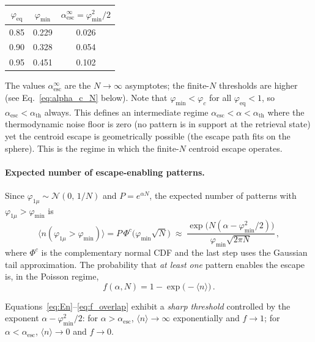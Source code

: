 \documentclass[11pt]{article}
\newcommand{\avg}[1]{\langle #1 \rangle}
\begin{document}
\begin{center}
\begin{tabular}{ccc}
\toprule
$\varphi_{\mathrm{eq}}$ & $\varphi_{\min}$ & $\alpha_{\mathrm{esc}}^{\infty} = \varphi_{\min}^2/2$ \\
\midrule
0.85 & 0.229 & 0.026 \\
0.90 & 0.328 & 0.054 \\
0.95 & 0.451 & 0.102 \\
\bottomrule
\end{tabular}
\end{center}

The values $\alpha_{\mathrm{esc}}^{\infty}$ are the $N\to\infty$ asymptotes; the finite-$N$ thresholds are higher (see Eq.~\eqref{eq:alpha_c_N} below).  Note that $\varphi_{\min} < \varphi_c$ for all $\varphi_{\mathrm{eq}} < 1$, so $\alpha_{\mathrm{esc}} < \alpha_{\mathrm{th}}$ always.  This defines an intermediate regime $\alpha_{\mathrm{esc}} < \alpha < \alpha_{\mathrm{th}}$ where the thermodynamic noise floor is zero (no pattern is in support at the retrieval state) yet the centroid escape is geometrically possible (the escape path fits on the sphere).  This is the regime in which the finite-$N$ centroid escape operates.

\paragraph{Expected number of escape-enabling patterns.}
Since $\varphi_{1\mu} \sim \mathcal{N}(0,\,1/N)$ and $P = e^{\alpha N}$, the expected number of patterns with $\varphi_{1\mu} > \varphi_{\min}$ is
\begin{equation}
\avg{n(\varphi_{1\mu} > \varphi_{\min})} = P\,\Phi^c\!\big(\varphi_{\min}\sqrt{N}\big)
\;\approx\; \frac{\exp\!\big(N(\alpha - \varphi_{\min}^2/2)\big)}{\varphi_{\min}\sqrt{2\pi N}}\,,
\label{eq:En}
\end{equation}
where $\Phi^c$ is the complementary normal CDF and the last step uses the Gaussian tail approximation.  The probability that \emph{at least one} pattern enables the escape is, in the Poisson regime,
\begin{equation}
f(\alpha,N) = 1 - \exp\!\big(-\avg{n}\big)\,.
\label{eq:f_overlap}
\end{equation}

Equations~\eqref{eq:En}--\eqref{eq:f_overlap} exhibit a \emph{sharp threshold} controlled by the exponent $\alpha - \varphi_{\min}^2/2$: for $\alpha > \alpha_{\mathrm{esc}}$, $\avg{n} \to \infty$ exponentially and $f \to 1$; for $\alpha < \alpha_{\mathrm{esc}}$, $\avg{n} \to 0$ and $f \to 0$.
\end{document}
